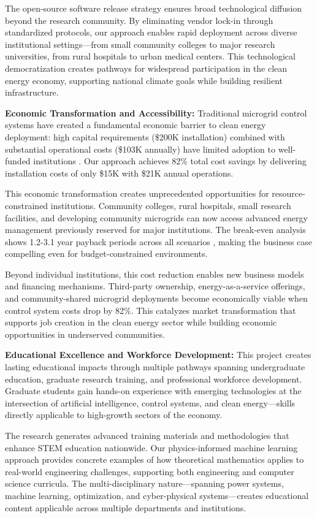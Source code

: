 \documentclass[12pt]{article}
\begin{document}
The open-source software release strategy ensures broad technological diffusion beyond the research community. By eliminating vendor lock-in through standardized protocols, our approach enables rapid deployment across diverse institutional settings—from small community colleges to major research universities, from rural hospitals to urban medical centers. This technological democratization creates pathways for widespread participation in the clean energy economy, supporting national climate goals while building resilient infrastructure.

\textbf{Economic Transformation and Accessibility:} Traditional microgrid control systems have created a fundamental economic barrier to clean energy deployment: high capital requirements (\$200K installation) combined with substantial operational costs (\$103K annually) have limited adoption to well-funded institutions \cite{hirsch2018,sigrin2019}. Our approach achieves 82\% total cost savings \cite{our2024economic} by delivering installation costs of only \$15K with \$21K annual operations.

This economic transformation creates unprecedented opportunities for resource-constrained institutions. Community colleges, rural hospitals, small research facilities, and developing community microgrids can now access advanced energy management previously reserved for major institutions. The break-even analysis shows 1.2-3.1 year payback periods across all scenarios \cite{our2024economic}, making the business case compelling even for budget-constrained environments.

Beyond individual institutions, this cost reduction enables new business models and financing mechanisms. Third-party ownership, energy-as-a-service offerings, and community-shared microgrid deployments become economically viable when control system costs drop by 82\%. This catalyzes market transformation that supports job creation in the clean energy sector while building economic opportunities in underserved communities.

\textbf{Educational Excellence and Workforce Development:} This project creates lasting educational impacts through multiple pathways spanning undergraduate education, graduate research training, and professional workforce development. Graduate students gain hands-on experience with emerging technologies at the intersection of artificial intelligence, control systems, and clean energy—skills directly applicable to high-growth sectors of the economy.

The research generates advanced training materials and methodologies that enhance STEM education nationwide. Our physics-informed machine learning approach provides concrete examples of how theoretical mathematics applies to real-world engineering challenges, supporting both engineering and computer science curricula. The multi-disciplinary nature—spanning power systems, machine learning, optimization, and cyber-physical systems—creates educational content applicable across multiple departments and institutions.
\end{document}
